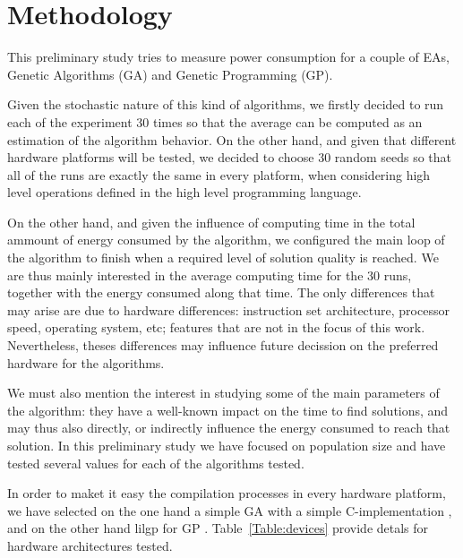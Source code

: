 \section{Methodology}
\label{methodology}

This preliminary study tries to measure power consumption for a couple
of EAs, Genetic Algorithms (GA) and Genetic Programming (GP). 

Given the stochastic nature of this kind of algorithms, we firstly decided to run each of the experiment 30 times so that the average can be computed as an estimation of the algorithm behavior.  On the other hand, and given that different hardware platforms will be tested, we decided to choose 30 random seeds so that all of the runs are exactly the same in every platform, when considering high level operations defined in the high level programming language.

On the other hand, and given the influence of computing time in the total ammount of energy consumed by the algorithm, we configured the main loop of the algorithm to finish when a required level of solution quality is reached. We are thus mainly interested in the average computing time for the 30 runs, together with the energy consumed along that time.  The only differences that may arise are due to hardware differences:  instruction set architecture, processor speed, operating system, etc;  %
features that are not in the focus of this work.  Nevertheless, theses differences may influence future decission on the preferred hardware for the algorithms.  

We must also mention the interest in studying some of the main parameters of the algorithm:  they have a well-known impact on the time to find solutions, and may thus also directly, or indirectly influence the energy consumed to reach that solution.  In this preliminary study we have focused on population size and have tested several values for each of the algorithms tested.

In order to maket it easy the compilation processes in every hardware platform, we have selected on the one hand a simple GA \cite{michalewicz} with a simple C-implementation \cite{web_algoritmo}, and on the other hand lilgp for GP \cite{lilgp}.  Table~\ref{Table:devices} provide detals for hardware architectures tested.

